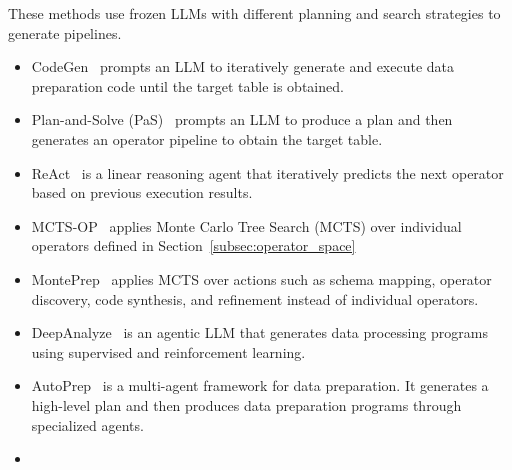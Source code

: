 
 These methods use frozen LLMs with different planning and search strategies to generate pipelines.
%
\begin{itemize}[leftmargin=*]
    \item CodeGen~\cite{li2024towards,sapkota2025vibe} prompts an LLM to iteratively generate and execute data preparation code
    until the target table is obtained.
    \item {Plan-and-Solve (PaS)}~\cite{wang2024chain} prompts an LLM to produce a plan and then generates an operator pipeline to obtain the target table. 
    \item {ReAct}~\cite{aksitov2023rest} is a linear reasoning agent that iteratively predicts the next operator based on previous execution results.
    \item {MCTS-OP}~\cite{li2025alphasql} applies Monte Carlo Tree Search (MCTS) over individual operators defined in Section~\ref{subsec:operator_space}
    \item {MontePrep}~\cite{ge2025monteprep} applies MCTS over actions such as schema mapping, operator discovery, code synthesis, and refinement instead of individual operators. 
    \item {DeepAnalyze}~\cite{zhang2025deepanalyze} is an agentic LLM that generates data processing programs using supervised and reinforcement learning.
    \item {AutoPrep}~\cite{fan2024autoprep} is a multi-agent framework for data preparation. It generates a high-level plan and then produces data preparation programs through specialized agents.
    \item {}
\end{itemize}

